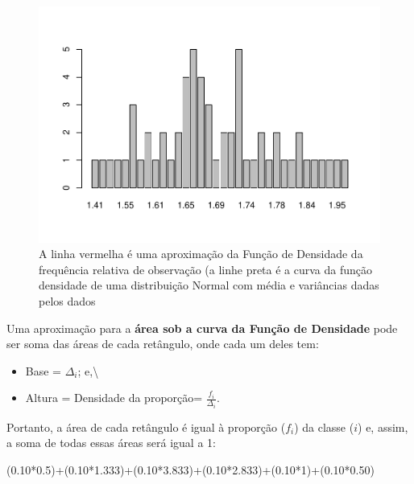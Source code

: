 \documentclass[
]{book}
\newenvironment{Shaded}{\begin{snugshade}}{\end{snugshade}}
\newcommand{\DecValTok}[1]{\textcolor[rgb]{0.00,0.00,0.81}{#1}}
\newcommand{\FloatTok}[1]{\textcolor[rgb]{0.00,0.00,0.81}{#1}}
\newcommand{\NormalTok}[1]{#1}
\newcommand{\SpecialCharTok}[1]{\textcolor[rgb]{0.00,0.00,0.00}{#1}}
\providecommand{\tightlist}{%
  \setlength{\itemsep}{0pt}\setlength{\parskip}{0pt}}
\begin{document}
\begin{figure}
\centering
\includegraphics{apostila_files/figure-latex/unnamed-chunk-44-1.pdf}
\caption{\label{fig:unnamed-chunk-44}A linha vermelha é uma aproximação da Função de Densidade da frequência relativa de observação (a linhe preta é a curva da função densidade de uma distribuição Normal com média e variâncias dadas pelos dados}
\end{figure}

\hfill\break

Uma aproximação para a \textbf{área sob a curva da Função de Densidade} pode ser soma das áreas de cada retângulo, onde cada um deles tem:

\hfill\break

\begin{itemize}
\tightlist
\item
  Base = \(\Delta_{i}\); e,\textbackslash{}
\item
  Altura = Densidade da proporção= \(\frac{f_{i}}{\Delta_{i}}\).
\end{itemize}

\hfill\break

Portanto, a área de cada retângulo é igual à proporção (\(f_{i}\)) da classe (\(i\)) e, assim, a soma de todas essas áreas será igual a 1:

\hfill\break

\begin{Shaded}
\begin{Highlighting}[]
\NormalTok{(}\FloatTok{0.10}\SpecialCharTok{*}\FloatTok{0.5}\NormalTok{)}\SpecialCharTok{+}\NormalTok{(}\FloatTok{0.10}\SpecialCharTok{*}\FloatTok{1.333}\NormalTok{)}\SpecialCharTok{+}\NormalTok{(}\FloatTok{0.10}\SpecialCharTok{*}\FloatTok{3.833}\NormalTok{)}\SpecialCharTok{+}\NormalTok{(}\FloatTok{0.10}\SpecialCharTok{*}\FloatTok{2.833}\NormalTok{)}\SpecialCharTok{+}\NormalTok{(}\FloatTok{0.10}\SpecialCharTok{*}\DecValTok{1}\NormalTok{)}\SpecialCharTok{+}\NormalTok{(}\FloatTok{0.10}\SpecialCharTok{*}\FloatTok{0.50}\NormalTok{)}
\end{Highlighting}
\end{Shaded}
\end{document}
